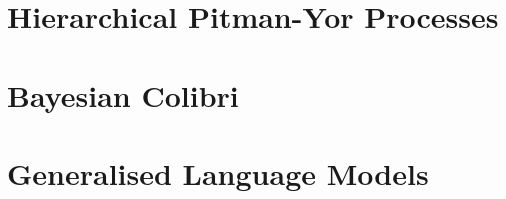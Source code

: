 \section{Hierarchical Pitman-Yor Processes}
\section{Bayesian Colibri}
\section{Generalised Language Models}





